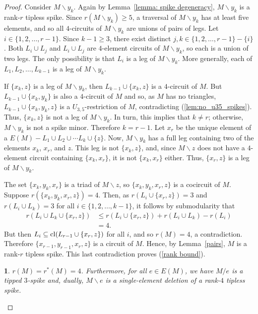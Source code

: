 \documentclass[11pt]{amsart}
\newtheorem{sublemma}{}[theorem]
\numberwithin{equation}{section} %
\newcommand{\cl}{{\rm cl}}
\begin{document}
\begin{proof}
Consider $M\backslash y_k$. Again by Lemma~\ref{lemma: spike degeneracy}, $M\backslash y_k$ is a rank-$r$ tipless spike. Since $r(M\backslash y_k)\ge 5$, a traversal of $M\backslash y_k$ has at least five elements, and so all $4$-circuits of $M\backslash y_k$ are unions of pairs of legs. Let $i \in \{1,2,\ldots,r-1\}$. Since $k-1 \geq 3$, there exist distinct $j, k \in \{1,2,\ldots,r-1\} - \{i\}$. Both $L_i \cup L_j$ and $L_i \cup L_j$ are $4$-element circuits of $M \backslash y_k$, so each is a union of two legs. The only possibility is that $L_i$ is a leg of $M \backslash y_k$. More generally, each of $L_1, L_2, \ldots, L_{k-1}$ is a leg of $M \backslash y_k$.

If $\{x_k, z\}$ is a leg of $M\backslash y_k$, then $L_{k-1}\cup \{x_k, z\}$ is a $4$-circuit of $M$. But $L_{k-1}\cup \{x_k, y_k\}$ is also a $4$-circuit of $M$ and so, as $M$ has no triangles, $L_{k-1}\cup \{x_k, y_k, z\}$ is a $U_{3, 5}$-restriction of $M$, contradicting (\ref{lem:no_u35_spikes}). Thus, $\{x_k, z\}$ is not a leg of $M\backslash y_k$. In turn, this implies that $k\neq r$; otherwise, $M\backslash y_k$ is not a spike minor. Therefore $k=r-1$. Let $x_r$ be the unique element of a $E(M) - L_1 \cup L_2 \cup \cdots L_k \cup \{z\}$. Now, $M \backslash y_k$ has a full leg containing two of the elements $x_k$, $x_r$, and $z$. This leg is not $\{x_k, z\}$, and, since $M \backslash z$ does not have a $4$-element circuit containing $\{x_k, x_r\}$, it is not $\{x_k,x_r\}$ either. Thus, $\{x_r, z\}$ is a leg of $M \backslash y_k$. 

The set $\{x_k,y_k,x_r\}$ is a triad of $M \backslash z$, so $\{x_k,y_k,x_r,z\}$ is a cocircuit of $M$. Suppose $r(\{x_k, y_k, x_r, z\})=4$. Then, as $r(L_i\cup \{x_r, z\})=3$ and $r(L_i\cup L_k)=3$ for all $i\in \{1, 2, \ldots, k-1\}$, it follows by submodularity that
\begin{align*}
r(L_i\cup L_k\cup \{x_r, z\}) & \le r(L_i\cup \{x_r, z\}) + r(L_i\cup L_k) - r(L_i) \\
& = 4.
\end{align*}
But then $L_i\subseteq \cl(L_{r-1}\cup \{x_r, z\})$ for all $i$, and so $r(M)=4$, a contradiction. Therefore $\{x_{r-1}, y_{r-1}, x_r, z\}$ is a circuit of $M$. Hence, by Lemma~\ref{pairs}, $M$ is a rank-$r$ tipless spike. This last contradiction proves (\ref{rank bound}).

\begin{sublemma}
\label{r4minors} 
$r(M)=r^*(M)=4$. Furthermore, for all $e\in E(M)$, we have $M/e$ is a tipped $3$-spike and, dually, $M\backslash e$ is a single-element deletion of a rank-$4$ tipless spike.
\end{sublemma}


\end{proof}
\end{document}
